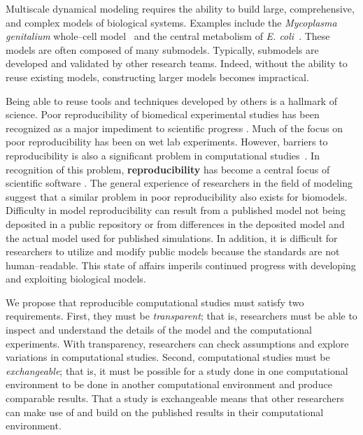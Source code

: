 \documentclass[10pt,letterpaper]{article}
\begin{document}
Multiscale dynamical modeling requires the ability to build large, comprehensive, and complex models of biological systems. Examples include the \textit{Mycoplasma genitalium} whole--cell model~\cite{karr2012whole} and the central metabolism of \textit{E. coli}~\cite{millard2017metabolic}. These models are often composed of many submodels. Typically, submodels are developed and validated by other research teams. Indeed, without the ability to reuse existing models, constructing larger models becomes impractical.

Being able to reuse tools and techniques developed by others is a hallmark of science. Poor reproducibility of biomedical experimental studies has been recognized as a major impediment to scientific progress \cite{prinz2011believe,mobley2013survey}. Much of the focus on poor reproducibility has been on wet lab experiments. However, barriers to reproducibility is also a significant problem in computational studies~\cite{peng2016moving,medley2016guidelines,mcdougal2016reproducibility,waltemath2016modeling}. In recognition of this problem, \textbf{reproducibility} has become a central focus of scientific software \cite{peng2011reproducible,sandve2013ten}. The general experience of researchers in the field of modeling suggest that a similar problem in poor reproducibility also exists for biomodels.  Difficulty in model reproducibility can result from a published model not being deposited in a public repository or from differences in the deposited model and the actual model used for published simulations.  In addition, it is difficult for researchers to utilize and modify public models because the standards are not human--readable. This state of affairs imperils continued progress with developing and exploiting biological models.




We propose that reproducible computational studies must satisfy two requirements. First, they must be  \textit{transparent}; that is, researchers must be able to inspect and understand the details of the model and the computational experiments. With transparency, researchers can check assumptions and explore variations in computational studies. Second, computational studies must be  \textit{exchangeable}; that is, it must be possible for a study done in one computational environment to be done in another computational environment and produce comparable results. That a study is exchangeable means that other researchers can make use of and build on the published results in their computational environment.
\end{document}
